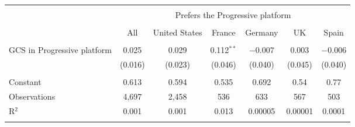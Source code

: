 
\begin{tabular}{@{\extracolsep{5pt}}lcccccc} 
\\[-1.8ex]\hline 
\hline \\[-1.8ex] 
 & \multicolumn{6}{c}{Prefers the Progressive platform} \\ 
\cline{2-7} 
\\[-1.8ex] & All & United States & France & Germany & UK & Spain \\ 
\hline \\[-1.8ex] 
 GCS in Progressive platform & 0.025 & 0.029 & 0.112$^{**}$ & $-$0.007 & 0.003 & $-$0.006 \\ 
  & (0.016) & (0.023) & (0.046) & (0.040) & (0.045) & (0.040) \\ 
 \hline \\[-1.8ex] 
Constant & 0.613 & 0.594 & 0.535 & 0.692 & 0.54 & 0.77 \\ 
Observations & 4,697 & 2,458 & 536 & 633 & 567 & 503 \\ 
R$^{2}$ & 0.001 & 0.001 & 0.013 & 0.00005 & 0.00001 & 0.0001 \\ 
\hline 
\hline \\[-1.8ex] 
\end{tabular} 
